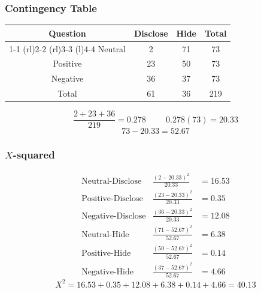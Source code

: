 \documentclass{beamer}
\begin{document}
\begin{frame}
  \frametitle{Contingency Table}
  \begin{table}
    \begin{tabular}{@{}cccc@{}}
      \toprule
      Question & Disclose & Hide & Total \\
      \cmidrule(r){1-1} \cmidrule(rl){2-2} \cmidrule(rl){3-3}
      \cmidrule(l){4-4}
      Neutral & 2 & 71 & 73 \\[0.3em]
      Positive & 23 & 50 & 73 \\[0.3em]
      Negative & 36 & 37 & 73 \\
      Total & 61 & 36 & 219 \\
      \bottomrule
    \end{tabular}
  \end{table}
  \begin{equation*}
    \frac{2 + 23 + 36}{219} = 0.278 \hspace{1cm} 0.278(73) = 20.33
  \end{equation*}
  \begin{equation*}
    73 - 20.33 = 52.67 
  \end{equation*}
\end{frame}

\begin{frame}
  \frametitle{$X$-squared}
  \begin{displaymath}
    \begin{array}{lll}
      \text{Neutral-Disclose} & \frac{(2 - 20.33)^2}{20.33} & = 16.53
      \\[0.5em]
      \text{Positive-Disclose} & \frac{(23 - 20.33)^2}{20.33} & = 0.35
      \\[0.5em]
      \text{Negative-Disclose} & \frac{(36 - 20.33)^2}{20.33} & =
      12.08 \\[0.5em]
      \text{Neutral-Hide} & \frac{(71 - 52.67)^2}{52.67} & = 6.38
      \\[0.5em]
      \text{Positive-Hide} & \frac{(50 - 52.67)^2}{52.67} & = 0.14
      \\[0.5em]
      \text{Negative-Hide} & \frac{(37 - 52.67)^2}{52.67} & = 4.66
    \end{array}
  \end{displaymath}
  \begin{equation*}
    X^2 = 16.53 + 0.35 + 12.08 + 6.38 + 0.14 + 4.66 = 40.13
  \end{equation*}
\end{frame}
\end{document}
